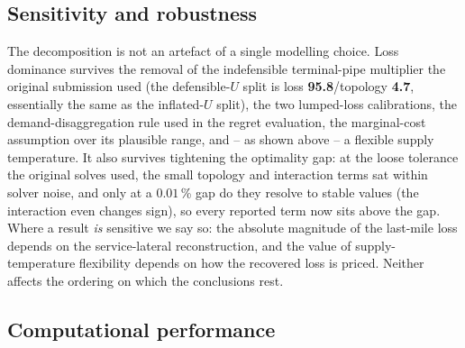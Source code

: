 \documentclass[a4paper,fleqn]{cas-dc}
\begin{document}
\subsection{Sensitivity and robustness}
The decomposition is not an artefact of a single modelling choice. Loss dominance survives the
removal of the indefensible terminal-pipe multiplier the original submission used (the
defensible-$U$ split is loss \textbf{95.8}/topology \textbf{4.7}, essentially the same
as the inflated-$U$ split), the two lumped-loss calibrations, the demand-disaggregation rule
used in the regret evaluation, the marginal-cost assumption over its plausible range, and -- as
shown above -- a flexible supply temperature. It also survives tightening the optimality gap:
at the loose tolerance the original solves used, the small topology and interaction terms sat
within solver noise, and only at a $0.01$\,\% gap do they resolve to stable values (the
interaction even changes sign), so every reported term now sits above the gap. Where a result
\emph{is} sensitive we say so: the absolute magnitude of the last-mile loss depends on the
service-lateral reconstruction, and the value of supply-temperature flexibility depends on how
the recovered loss is priced. Neither affects the ordering on which the conclusions rest.



\subsection{Computational performance}

\end{document}
